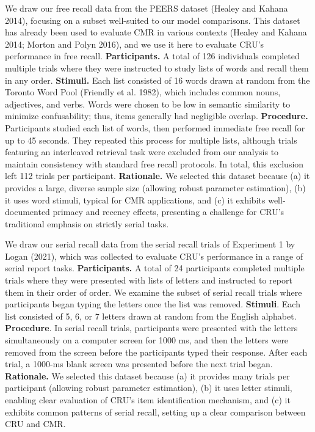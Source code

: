 \documentclass[
  letterpaper,
  11pt,
  english,
  singlespacing,
  headsepline]{MastersDoctoralThesis}
\begin{document}
We draw our free recall data from the PEERS dataset (Healey and Kahana
2014), focusing on a subset well-suited to our model comparisons. This
dataset has already been used to evaluate CMR in various contexts
(Healey and Kahana 2014; Morton and Polyn 2016), and we use it here to
evaluate CRU's performance in free recall. \textbf{Participants.} A
total of 126 individuals completed multiple trials where they were
instructed to study lists of words and recall them in any order.
\textbf{Stimuli.} Each list consisted of 16 words drawn at random from
the Toronto Word Pool (Friendly et al. 1982), which includes common
nouns, adjectives, and verbs. Words were chosen to be low in semantic
similarity to minimize confusability; thus, items generally had
negligible overlap. \textbf{Procedure.} Participants studied each list
of words, then performed immediate free recall for up to 45 seconds.
They repeated this process for multiple lists, although trials featuring
an interleaved retrieval task were excluded from our analysis to
maintain consistency with standard free recall protocols. In total, this
exclusion left 112 trials per participant. \textbf{Rationale.} We
selected this dataset because (a) it provides a large, diverse sample
size (allowing robust parameter estimation), (b) it uses word stimuli,
typical for CMR applications, and (c) it exhibits well-documented
primacy and recency effects, presenting a challenge for CRU's
traditional emphasis on strictly serial tasks.

We draw our serial recall data from the serial recall trials of
Experiment 1 by Logan (2021), which was collected to evaluate CRU's
performance in a range of serial report tasks. \textbf{Participants.} A
total of 24 participants completed multiple trials where they were
presented with lists of letters and instructed to report them in their
order of order. We examine the subset of serial recall trials where
participants began typing the letters once the list was removed.
\textbf{Stimuli}. Each list consisted of 5, 6, or 7 letters drawn at
random from the English alphabet. \textbf{Procedure}. In serial recall
trials, participants were presented with the letters simultaneously on a
computer screen for 1000 ms, and then the letters were removed from the
screen before the participants typed their response. After each trial, a
1000-ms blank screen was presented before the next trial began.
\textbf{Rationale.} We selected this dataset because (a) it provides
many trials per participant (allowing robust parameter estimation), (b)
it uses letter stimuli, enabling clear evaluation of CRU's item
identification mechanism, and (c) it exhibits common patterns of serial
recall, setting up a clear comparison between CRU and CMR.
\end{document}
